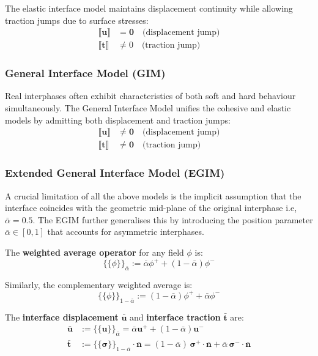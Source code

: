 \documentclass[oneside, 12pt, a4paper, bibliography=totoc]{book}
\newcommand{\jump}[1]{\llbracket #1 \rrbracket}    %
\newcommand{\bs}[1]{\bm{#1}}                       %
\begin{document}
The elastic interface model maintains displacement continuity while allowing traction jumps due to surface stresses:
%
\begin{align}
    \jump{\bs{u}} &= \bs{0} \quad \text{(displacement jump)} \label{eq:elastic_disp}\\
    \jump{\bs{t}} &\neq 0 \quad \text{(traction jump)} \label{eq:elastic_trac}
\end{align}
%
\subsubsection{General Interface Model (GIM)}
\label{subsec:gim}

Real interphases often exhibit characteristics of both soft and hard behaviour simultaneously. The General Interface Model unifies the cohesive and elastic models by admitting both displacement and traction jumps:
%
\begin{align}
    \jump{\bs{u}} &\neq \bs{0} \quad \text{(displacement jump)} \label{eq:cohesive_disp}\\
    \jump{\bs{t}} &\neq \bs{0} \quad \text{(traction jump)} \label{eq:cohesive_trac}
\end{align}
%

\subsubsection{Extended General Interface Model (EGIM)}
\label{subsec:egim}

A crucial limitation of all the above models is the implicit assumption that the interface coincides with the geometric mid-plane of the original interphase i.e, $\bar{\alpha} = 0.5$. The EGIM further generalises this by introducing the position parameter $\bar{\alpha} \in [0, 1]$ that accounts for asymmetric interphases.

The \textbf{weighted average operator} for any field $\phi$ is:
%
\begin{equation}
    \{\!\{ \phi \}\!\}_{\bar{\alpha}} := \bar{\alpha}\phi^+ + (1 - \bar{\alpha})\phi^-
    \label{eq:weighted_average}
\end{equation}

Similarly, the complementary weighted average is:
%
\begin{equation}
    \{\!\{ \phi \}\!\}_{1-\bar{\alpha}} := (1 - \bar{\alpha})\phi^+ + \bar{\alpha}\phi^-
    \label{eq:complementary_average}
\end{equation}

The \textbf{interface displacement} $\bar{\bs{u}}$ and \textbf{interface traction} $\bar{\bs{t}}$ are:
%
\begin{align}
    \bar{\bs{u}} &:= \{\!\{\bs{u} \}\!\}_{\bar{\alpha}} = \bar{\alpha}\bs{u}^+ + (1 - \bar{\alpha})\bs{u}^- \label{eq:interface_position}\\
    \bar{\bs{t}} &:= \{\!\{\bs{\sigma}\}\!\}_{1-\bar{\alpha}} \cdot \bar{\bs{n}} =  (1-\bar{\alpha})\,\bs{\sigma}^+ \cdot \bar{\bs{n}} + \bar{\alpha}\,\bs{\sigma}^- \cdot \bar{\bs{n}} \label{eq:interface_traction}
\end{align}
\end{document}
